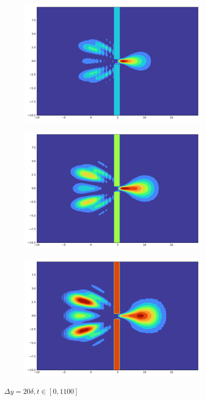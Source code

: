 \begin{figure}[h!]
\begin{subfigure}{0.3\linewidth}
    \end{subfigure}
    \begin{subfigure}{0.3\linewidth}
        \includegraphics[width=\linewidth]{10/900}
    \end{subfigure}
    \begin{subfigure}{0.3\linewidth}
        \includegraphics[width=\linewidth]{10/1000}
    \end{subfigure}
    \begin{subfigure}{0.3\linewidth}
        \includegraphics[width=\linewidth]{10/1100}
    \end{subfigure}
    \caption{$\Delta y=20\delta,t\in[0,1100]$}
\end{figure}
